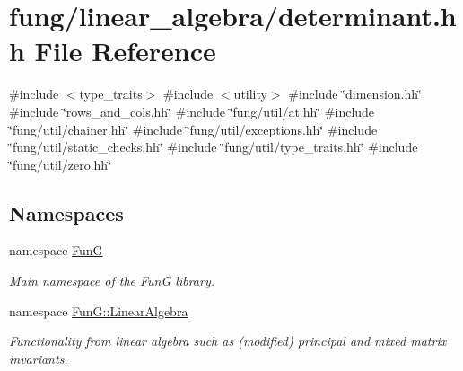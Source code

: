 \hypertarget{determinant_8hh}{\section{fung/linear\-\_\-algebra/determinant.hh \-File \-Reference}
\label{determinant_8hh}
}
{\ttfamily \#include $<$type\-\_\-traits$>$}\*
{\ttfamily \#include $<$utility$>$}\*
{\ttfamily \#include \char`\"{}dimension.\-hh\char`\"{}}\*
{\ttfamily \#include \char`\"{}rows\-\_\-and\-\_\-cols.\-hh\char`\"{}}\*
{\ttfamily \#include \char`\"{}fung/util/at.\-hh\char`\"{}}\*
{\ttfamily \#include \char`\"{}fung/util/chainer.\-hh\char`\"{}}\*
{\ttfamily \#include \char`\"{}fung/util/exceptions.\-hh\char`\"{}}\*
{\ttfamily \#include \char`\"{}fung/util/static\-\_\-checks.\-hh\char`\"{}}\*
{\ttfamily \#include \char`\"{}fung/util/type\-\_\-traits.\-hh\char`\"{}}\*
{\ttfamily \#include \char`\"{}fung/util/zero.\-hh\char`\"{}}\*
\subsection*{\-Namespaces}
\begin{DoxyCompactItemize}
\item 
namespace \hyperlink{namespaceFunG}{\-Fun\-G}
\begin{DoxyCompactList}\small\item\em \-Main namespace of the \-Fun\-G library. \end{DoxyCompactList}\item 
namespace \hyperlink{namespaceFunG_1_1LinearAlgebra}{\-Fun\-G\-::\-Linear\-Algebra}
\begin{DoxyCompactList}\small\item\em \-Functionality from linear algebra such as (modified) principal and mixed matrix invariants. \end{DoxyCompactList}\end{DoxyCompactItemize}
